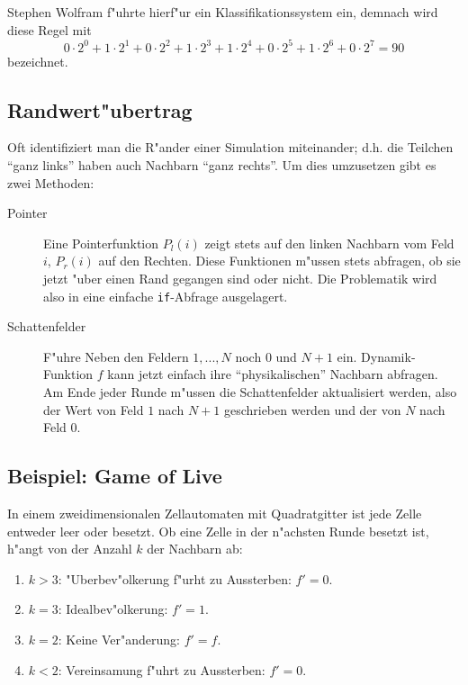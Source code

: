 \documentclass[a4paper]{book}
\begin{document}
Stephen Wolfram f"uhrte hierf"ur ein Klassifikationssystem ein,
demnach wird diese Regel mit
\begin{equation*}
0 \cdot 2^0 + 
1 \cdot 2^1 + 
0 \cdot 2^2 + 
1 \cdot 2^3 + 
1 \cdot 2^4 + 
0 \cdot 2^5 + 
1 \cdot 2^6 + 
0 \cdot 2^7 = 90 
\end{equation*}
bezeichnet.



\subsection{Randwert"ubertrag}
\label{sec:randwertubertrag}

Oft identifiziert man die R"ander einer Simulation miteinander;
d.h. die Teilchen "`ganz links"' haben auch Nachbarn "`ganz
rechts"'. Um dies umzusetzen gibt es zwei Methoden:
\begin{description}
\item[Pointer] Eine Pointerfunktion $P_l(i)$ zeigt stets auf den
  linken Nachbarn vom Feld $i$, $P_r(i)$ auf den Rechten. Diese
  Funktionen m"ussen stets abfragen, ob sie jetzt "uber einen Rand
  gegangen sind oder nicht. Die Problematik wird also in eine einfache
  \texttt{if}-Abfrage ausgelagert.
\item[Schattenfelder] F"uhre Neben den Feldern $1,...,N$ noch $0$ und
  $N+1$ ein. Dynamik-Funktion $f$ kann jetzt einfach ihre
  "`physikalischen"' Nachbarn abfragen. Am Ende jeder Runde m"ussen
  die Schattenfelder aktualisiert werden, also der Wert von Feld $1$
  nach $N+1$ geschrieben werden und der von $N$ nach Feld $0$.
\end{description}



\subsection{Beispiel: Game of Live}
\label{sec:beispiel:_game_of_live}

In einem zweidimensionalen Zellautomaten mit Quadratgitter ist jede
Zelle entweder leer oder besetzt. Ob eine Zelle in der n"achsten Runde
besetzt ist, h"angt von der Anzahl $k$ der Nachbarn ab:
\begin{enumerate}
\item $k > 3$: "Uberbev"olkerung f"urht zu Aussterben: $f' = 0$.
\item $k = 3$: Idealbev"olkerung: $f' = 1$.
\item $k = 2$: Keine Ver"anderung: $f' = f$.
\item $k < 2$: Vereinsamung f"uhrt zu Aussterben: $f' = 0$.
\end{enumerate}
\end{document}
